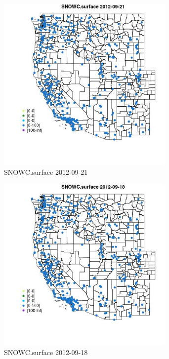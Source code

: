 \begin{figure} 
\centering  
\includegraphics[width=0.77\textwidth]{Code_Outputs/Report_ML_input_PM25_Step4_part_e_de_duplicated_aves_compiled_2019-05-14wNAs_MapObsSNOWCsurface2012-09-21.jpg} 
\caption{\label{fig:Report_ML_input_PM25_Step4_part_e_de_duplicated_aves_compiled_2019-05-14wNAsMapObsSNOWCsurface2012-09-21}SNOWC.surface 2012-09-21} 
\end{figure} 
 

\begin{figure} 
\centering  
\includegraphics[width=0.77\textwidth]{Code_Outputs/Report_ML_input_PM25_Step4_part_e_de_duplicated_aves_compiled_2019-05-14wNAs_MapObsSNOWCsurface2012-09-18.jpg} 
\caption{\label{fig:Report_ML_input_PM25_Step4_part_e_de_duplicated_aves_compiled_2019-05-14wNAsMapObsSNOWCsurface2012-09-18}SNOWC.surface 2012-09-18} 
\end{figure} 
 

